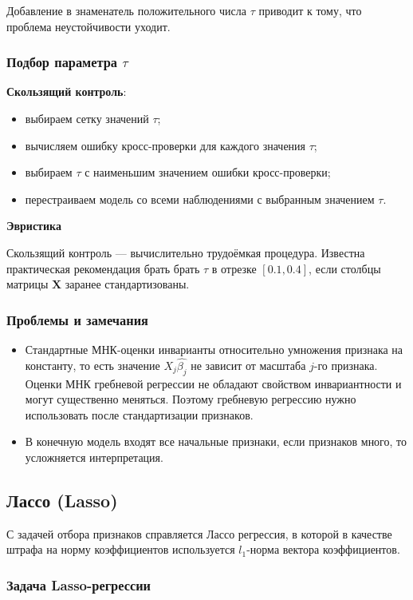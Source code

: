 \documentclass[12pt,a4paper,final]{article}
\newcommand{\1}{\mathds{1}}
\begin{document}
Добавление в знаменатель положительного числа $\tau$ приводит к тому, что проблема неустойчивости уходит. 

\subsubsection{Подбор параметра $\tau$}
	\textbf{Скользящий контроль}:
\begin{itemize}
	\item выбираем сетку значений $\tau$;
	\item вычисляем ошибку кросс-проверки для каждого значения $\tau$;
	\item выбираем $\tau$ с наименьшим значением ошибки кросс-проверки;
	\item перестраиваем модель со всеми наблюдениями с выбранным значением $\tau$.
\end{itemize}

\textbf{Эвристика }

Скользящий контроль --- вычислительно трудоёмкая процедура. Известна практическая рекомендация брать брать $\tau$ в отрезке $[0.1, 0.4]$, если столбцы матрицы $\bm{X}$ заранее стандартизованы.

\subsubsection{Проблемы и замечания}
\begin{itemize}
	\item Стандартные МНК-оценки инварианты относительно умножения признака на константу, то есть значение $X_{j}\hat{\beta_j}$ не зависит от масштаба $j$-го признака. Оценки МНК гребневой регрессии не обладают свойством инвариантности и могут существенно меняться.	Поэтому гребневую регрессию нужно использовать после стандартизации признаков.
	\item  В конечную модель входят все начальные признаки, если признаков много, то усложняется интерпретация.
\end{itemize}


\subsection{Лассо (Lasso)}

С задачей отбора признаков справляется Лассо регрессия, в которой в качестве штрафа на норму коэффициентов используется $l_{1}$-норма вектора коэффициентов.


\subsubsection{Задача Lasso-регрессии}
\end{document}
